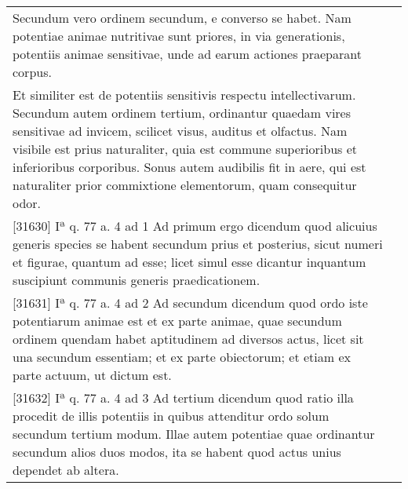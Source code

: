 \documentclass[paper=a4paper,fontsize=10pt,jafontsize=9pt,titlepage]{jlreq}
\begin{document}
\begin{longtable}{p{21em}p{21em}}
 Secundum vero ordinem secundum,
 e converso se habet. Nam potentiae animae nutritivae sunt priores, in
 via generationis, potentiis animae sensitivae, unde ad earum actiones
 praeparant corpus.


 
&



\\


 Et similiter est de potentiis sensitivis respectu
 intellectivarum. Secundum autem ordinem tertium, ordinantur quaedam
 vires sensitivae ad invicem, scilicet visus, auditus et olfactus. Nam
 visibile est prius naturaliter, quia est commune superioribus et
 inferioribus corporibus. Sonus autem audibilis fit in aere, qui est
 naturaliter prior commixtione elementorum, quam consequitur odor.

 
&



\\



[31630] Iª q. 77 a. 4 ad 1
 Ad primum ergo dicendum quod alicuius generis species se habent secundum prius et posterius, sicut numeri et figurae, quantum ad esse; licet simul esse dicantur inquantum suscipiunt communis generis praedicationem.

 
&



\\



[31631] Iª q. 77 a. 4 ad 2
 Ad secundum dicendum quod ordo iste potentiarum animae est et ex parte animae, quae secundum ordinem quendam habet aptitudinem ad diversos actus, licet sit una secundum essentiam; et ex parte obiectorum; et etiam ex parte actuum, ut dictum est.

 
&



\\



[31632] Iª q. 77 a. 4 ad 3
 Ad tertium dicendum quod ratio illa procedit de illis potentiis in quibus attenditur ordo solum secundum tertium modum. Illae autem potentiae quae ordinantur secundum alios duos modos, ita se habent quod actus unius dependet ab altera.

 
&





\end{longtable}
\newpage
\end{document}
